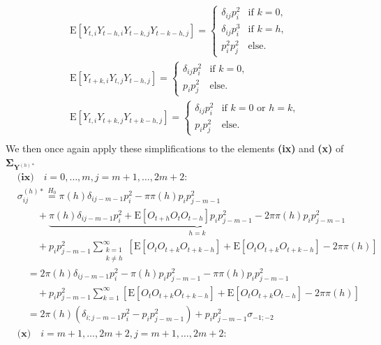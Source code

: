 ﻿\documentclass[12pt,a4paper]{scrreprt}
\theoremstyle{definition}
\begin{document}
\begin{appendices}
\begin{align*}
    &\mathrm{E}[Y_{t,i}Y_{t-h,i}Y_{t-k,j}Y_{t-k-h,j}] 
    = \begin{cases}
        \delta_{ij} p_i^2 & \text{if } k = 0,\\
        \delta_{ij} p_i^3 & \text{if } k = h,\\
        p_i^2 p_j^2 & \text{else.} 
    \end{cases}\\
    &\mathrm{E}[Y_{t+k, i}Y_{t,j}Y_{t-h,j}] 
    = \begin{cases}
        \delta_{ij} p_i^2 & \text{if } k = 0,\\
        p_i p_j^2 & \text{else.} 
    \end{cases}\\
    &\mathrm{E}[Y_{t,i}Y_{t+k,j}Y_{t+k-h,j}] 
    = \begin{cases}
        \delta_{ij} p_i^2 & \text{if } k = 0 \text{ or } h = k,\\
        p_i  p_j^2 & \text{else.} 
    \end{cases}\\
\end{align*}
We then once again apply these simplifications to the elements
\textbf{(ix)} and \textbf{(x)} of $\boldsymbol{\Sigma}_{\boldsymbol{Y}^{(h)*}}$
{\allowdisplaybreaks\begin{align*}
    &\textbf{(ix)}\quad  i = 0, \ldots, m, j = m+1, \ldots, 2m+2: \\
    &\sigma_{ij}^{(h)*} \overset{H_0}{=} \pi(h) \delta_{ij-m-1} p_i^2 - \pi \pi(h) p_i p_{j-m-1}^2 \\
    &\qquad + \underbrace{\pi(h)\delta_{ij-m-1}p_i^2 + \mathrm{E}[O_{t+h}O_t O_{t-h}]p_i p_{j-m-1}^2 - 2 \pi \pi(h)p_i p_{j-m-1}^2}_{h=k} \\
    &\qquad +  p_i p_{j-m-1}^2 \sum_{\substack{k=1\\k\neq h}}^{\infty}  \left[\mathrm{E}[O_t O_{t+k} O_{t+k-h}] + \mathrm{E}[O_t O_{t+k} O_{t+k-h}] - 2\pi\pi(h)\right] \\
    &\quad = 2\pi(h)\delta_{ij-m-1} p_i^2 - \pi(h) p_i p_{j-m-1}^2 - \pi\pi(h)p_i p_{j-m-1}^2 \\
    &\qquad + p_i p_{j-m-1}^2 \sum_{k= 1}^{\infty}  \left[\mathrm{E}[O_t O_{t+k} O_{t+k-h}] + \mathrm{E}[O_t O_{t+k} O_{t-h}] - 2\pi\pi(h)\right] \\
    &\quad = 2\pi(h) (\delta_{i;j-m-1}p_i^2 - p_i p_{j-m-1}^2)+p_i p_{j-m-1}^2 \sigma_{-1;-2} \\
    &\textbf{(x)}\quad  i = m+1, \ldots, 2m+2, j = m+1, \ldots, 2m+2: \\

\end{align*}}
\end{appendices}
\end{document}
